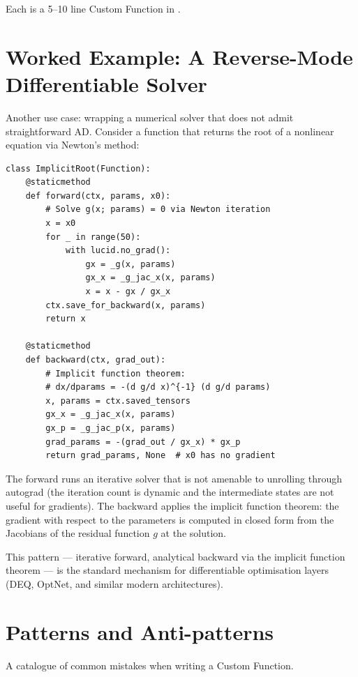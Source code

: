 Each is a 5--10 line Custom Function in \Lucid.

\section{Worked Example: A Reverse-Mode Differentiable Solver}
\label{sec:custom_functions:solver_example}

Another use case: wrapping a numerical solver that does not admit
straightforward AD. Consider a function that returns the root of a
nonlinear equation via Newton's method:

\begin{lstlisting}[style=lucid,language=LucidPython]
class ImplicitRoot(Function):
    @staticmethod
    def forward(ctx, params, x0):
        # Solve g(x; params) = 0 via Newton iteration
        x = x0
        for _ in range(50):
            with lucid.no_grad():
                gx = _g(x, params)
                gx_x = _g_jac_x(x, params)
                x = x - gx / gx_x
        ctx.save_for_backward(x, params)
        return x

    @staticmethod
    def backward(ctx, grad_out):
        # Implicit function theorem:
        # dx/dparams = -(d g/d x)^{-1} (d g/d params)
        x, params = ctx.saved_tensors
        gx_x = _g_jac_x(x, params)
        gx_p = _g_jac_p(x, params)
        grad_params = -(grad_out / gx_x) * gx_p
        return grad_params, None  # x0 has no gradient
\end{lstlisting}

The forward runs an iterative solver that is not amenable to
unrolling through autograd (the iteration count is dynamic and the
intermediate states are not useful for gradients). The backward
applies the implicit function theorem: the gradient with respect
to the parameters is computed in closed form from the Jacobians of
the residual function $g$ at the solution.

This pattern --- iterative forward, analytical backward via the
implicit function theorem --- is the standard mechanism for
differentiable optimisation layers (DEQ, OptNet, and similar
modern architectures).

\section{Patterns and Anti-patterns}
\label{sec:custom_functions:patterns}

A catalogue of common mistakes when writing a Custom Function.

